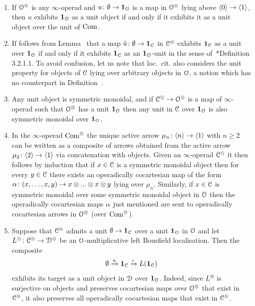 \begin{remarks}\
\label{remarks:symmetric-monoidal-objects-and-units}%
\begin{enumerate}
\item
If $\mathcal{O}^{\otimes}$ is any $\infty$-operad and $u\colon \emptyset \to \mathbf{1}_{\mathcal{O}}$  is a map in $\mathcal{O}^{\otimes}$ lying above $\langle0\rangle \to \langle1\rangle$, then $u$ exhibits $\mathbf{1}_{\mathcal{O}}$ as a unit object if and only if it exhibits it as a unit object over the unit of $\mathrm{Com}$. %
\item
\label{item:HA}%
If follows from Lemma~ that a map $\tilde{u}\colon \emptyset \to \mathbf{1}_\mathcal C$ in $\mathcal C^{\otimes}$ exhibits $\mathbf{1}_\mathcal C$ as a unit over $\mathbf{1}_{\mathcal{O}}$ if and only if it exhibits $\mathbf{1}_{\mathcal C}$ as an $\mathbf{1}_{\mathcal{O}}$-unit in the sense of~\cite{HA}*{Definition 3.2.1.1}. To avoid confusion, let us note that loc.\ cit. also considers the unit property for objects of $\mathcal C$ lying over arbitrary objects in $\mathcal{O}$, a notion which has no counterpart in Definition~.
\item
\label{item:unit-is-monoidal}%
Any unit object is symmetric monoidal, and if $\mathcal C^{\otimes} \to \mathcal{O}^{\otimes}$ is a map of $\infty$-operad such that $\mathcal{O}^{\otimes}$ has a unit $\mathbf{1}_{\mathcal{O}}$ then any unit in $\mathcal C$ over $\mathbf{1}_{\mathcal{O}}$ is also symmetric monoidal over $\mathbf{1}_{\mathcal{O}}$. %
\item
\label{item:simplifies}%
In the $\infty$-operad $\mathrm{Com}^{\otimes}$ the unique active arrow $\mu_n\colon \langle n\rangle \to \langle1\rangle$ with $n \geq 2$ can be written as a composite of arrows obtained from the active arrow $\mu_2\colon \langle2\rangle \to \langle1\rangle$ via concatenation with objects. Given an $\infty$-operad $\mathcal C^{\otimes}$ it then follows by induction that if $x \in \mathcal C$ is a symmetric monoidal object then for every $y \in \mathcal C$ there exists an operadically cocartesian map of the form $\alpha\colon (x,\dots,x,y) \to x\otimes ... \otimes x\otimes y$ lying over $\mu_n$. Similarly, if $x \in \mathcal C$ is symmetric monoidal over some symmetric monoidal object in $\mathcal{O}$ then the operadically cocartesian maps $\alpha$ just mentioned are sent to operadically cocartesian arrows in $\mathcal{O}^{\otimes}$ (over $\mathrm{Com}^{\otimes}$). %
\item
\label{item:local-unit}%
Suppose that $\mathcal C^{\otimes}$ admits a unit $\emptyset \to \mathbf{1}_{\mathcal C}$ over a unit $\mathbf{1}_{\mathcal{O}}$ in $\mathcal{O}$ and let $L^{\otimes} \colon \mathcal C^{\otimes} \to \mathcal{D}^{\otimes}$ be an $\mathcal{O}$-multiplicative left Bousfield localisation. %
Then the composite 
\[
\emptyset \xrightarrow{u} \mathbf{1}_{\mathcal C} \xrightarrow{\epsilon} L(\mathbf{1}_\mathcal C)
\]
exhibits its target as a unit object in $\mathcal{D}$ over $\mathbf{1}_{\mathcal{O}}$. Indeed, since $L^{\otimes}$ is surjective on objects and preserves cocartesian maps over $\mathcal{O}^{\otimes}$ that exist in $\mathcal C^{\otimes}$, it also preserves all operadically cocartesian maps that exist in $\mathcal C^{\otimes}$.
\end{enumerate}

\end{remarks}





